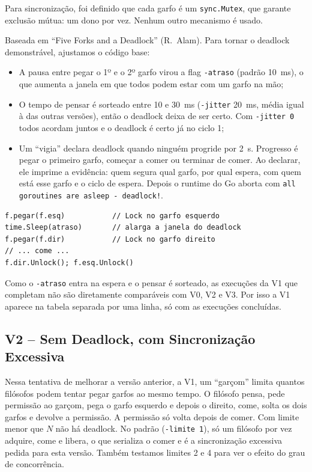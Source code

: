 \documentclass[12pt,brazil,a4paper]{article}
\begin{document}
Para sincronização, foi definido que cada garfo é um \texttt{sync.Mutex}, que garante exclusão mútua: um dono por vez. Nenhum outro mecanismo é usado.

Baseada em ``Five Forks and a Deadlock'' (R.~Alam). Para tornar o deadlock demonstrável, ajustamos o código base:

\begin{itemize}
\item A pausa entre pegar o 1º e o 2º garfo virou a flag \texttt{-atraso} (padrão 10~ms), o que aumenta a janela em que todos podem estar com um garfo na mão;
\item O tempo de pensar é sorteado entre 10 e 30~ms (\texttt{-jitter} 20~ms, média igual à das outras versões), então o deadlock deixa de ser certo. Com \texttt{-jitter 0} todos acordam juntos e o deadlock é certo já no ciclo 1;
\item Um ``vigia'' declara deadlock quando ninguém progride por 2~s. Progresso é pegar o primeiro garfo, começar a comer ou terminar de comer. Ao declarar, ele imprime a evidência: quem segura qual garfo, por qual espera, com quem está esse garfo e o ciclo de espera. Depois o runtime do Go aborta com \texttt{all goroutines are asleep - deadlock!}.
\end{itemize}

\begin{lstlisting}
f.pegar(f.esq)           // Lock no garfo esquerdo
time.Sleep(atraso)       // alarga a janela do deadlock
f.pegar(f.dir)           // Lock no garfo direito
// ... come ...
f.dir.Unlock(); f.esq.Unlock()
\end{lstlisting}

Como o \texttt{-atraso} entra na espera e o pensar é sorteado, as execuções da V1 que completam não são diretamente comparáveis com V0, V2 e V3. Por isso a V1 aparece na tabela separada por uma linha, só com as execuções concluídas.

\subsection{V2 -- Sem Deadlock, com Sincronização Excessiva}
Nessa tentativa de melhorar a versão anterior, a V1, um ``garçom'' limita quantos filósofos podem tentar pegar garfos ao mesmo tempo. O filósofo pensa, pede permissão ao garçom, pega o garfo esquerdo e depois o direito, come, solta os dois garfos e devolve a permissão. A permissão só volta depois de comer. Com limite menor que $N$ não há deadlock. No padrão (\texttt{-limite 1}), só um filósofo por vez adquire, come e libera, o que serializa o comer e é a sincronização excessiva pedida para esta versão. Também testamos limites 2 e 4 para ver o efeito do grau de concorrência.
\end{document}
